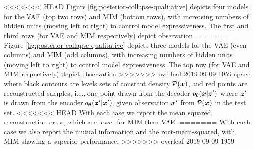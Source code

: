 <<<<<<< HEAD
Figure \ref{fig:posterior-collapse-qualitative} depicts four models 
for the VAE (top two rows) and MIM (bottom rows), with increasing numbers 
of hidden units (moving left to right) to control model expressiveness.
The first and third rows (for VAE and MIM respectively) depict observation 
=======
Figure \ref{fig:posterior-collapse-qualitative} depicts three models 
for the VAE (even columns) and MIM (odd columns), with increasing numbers 
of hidden units (moving left to right) to control model expressiveness.
The top row (for VAE and MIM respectively) depict observation 
>>>>>>> overleaf-2019-09-09-1959
space where black contours are levels sets of constant density 
$\mathcal{P} ({\boldsymbol{x}})$, and red points are reconstructed samples, 
i.e., one point drawn from the decoder $p_{{\boldsymbol \theta}}({\boldsymbol{x}} | {\boldsymbol z}' )$ where ${\boldsymbol z}'$ is 
drawn from the encoder $ q_{{\boldsymbol \theta}}({\boldsymbol z}' | {\boldsymbol{x}}') $, given observation ${\boldsymbol{x}}'$ 
from $\mathcal{P}({\boldsymbol{x}})$ in the test set.
<<<<<<< HEAD
With each case we report the mean squared reconstruction error, which are 
lower for MIM than VAE. 
=======
With each case we also report the mutual information and the root-mean-squared,
with MIM showing a superior performance.
>>>>>>> overleaf-2019-09-09-1959


